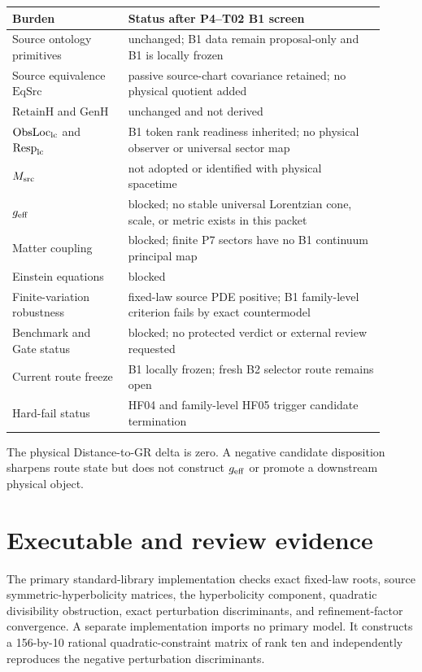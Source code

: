 \documentclass[11pt]{article}
\begin{document}
\begin{longtable}{p{0.29\linewidth}p{0.62\linewidth}}
\toprule
Burden & Status after P4--T02 B1 screen\\
\midrule
Source ontology primitives & unchanged; B1 data remain proposal-only and B1 is locally frozen\\
Source equivalence $\mathrm{EqSrc}$ & passive source-chart covariance retained; no physical quotient added\\
$\mathrm{RetainH}$ and $\mathrm{GenH}$ & unchanged and not derived\\
$\mathrm{ObsLoc}_{\rm lc}$ and $\mathrm{Resp}_{\rm lc}$ & B1 token rank readiness inherited; no physical observer or universal sector map\\
$M_{\rm src}$ & not adopted or identified with physical spacetime\\
$g_{\rm eff}$ & blocked; no stable universal Lorentzian cone, scale, or metric exists in this packet\\
Matter coupling & blocked; finite P7 sectors have no B1 continuum principal map\\
Einstein equations & blocked\\
Finite-variation robustness & fixed-law source PDE positive; B1 family-level criterion fails by exact countermodel\\
Benchmark and Gate status & blocked; no protected verdict or external review requested\\
Current route freeze & B1 locally frozen; fresh B2 selector route remains open\\
Hard-fail status & HF04 and family-level HF05 trigger candidate termination\\
\bottomrule
\end{longtable}

The physical Distance-to-GR delta is zero.  A negative candidate disposition
sharpens route state but does not construct $g_{\rm eff}$ or promote a
downstream physical object.

\section{Executable and review evidence}

The primary standard-library implementation checks exact fixed-law roots,
source symmetric-hyperbolicity matrices, the hyperbolicity component,
quadratic divisibility obstruction, exact perturbation discriminants, and
refinement-factor convergence.  A separate implementation imports no primary
model.  It constructs a 156-by-10 rational quadratic-constraint matrix of
rank ten and independently reproduces the negative perturbation discriminants.
\end{document}
